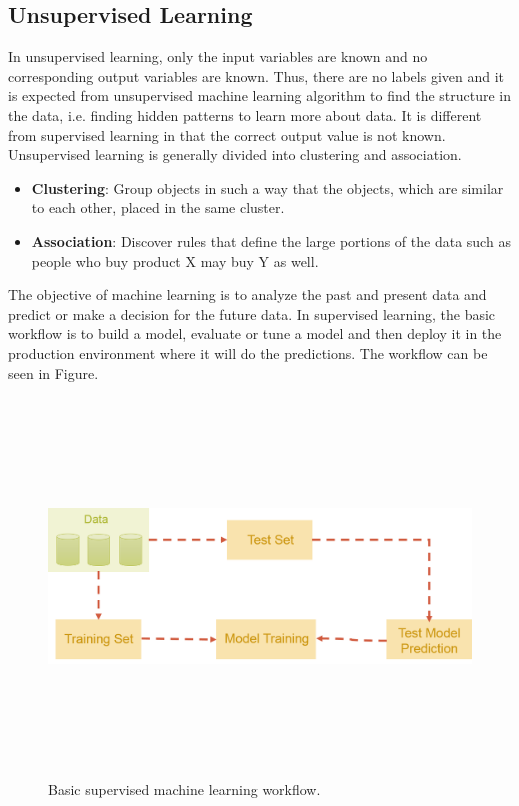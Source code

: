 \subsection{Unsupervised Learning}

In unsupervised learning, only the input variables are known and no corresponding output variables are known. Thus, there are no labels given and it is expected from unsupervised machine learning algorithm to find the structure in the data, i.e. finding hidden patterns to learn more about data. It is different from supervised learning in that the correct output value is not known. Unsupervised learning is generally divided into clustering and association.

\begin{itemize}
	\item \textbf{Clustering}: Group objects in such a way that the objects, which are similar to each other, placed in the same cluster.
	\item \textbf{Association}: Discover rules that define the large portions of the data such as people who buy product X may buy Y as well.
\end{itemize}

The objective of machine learning is to analyze the past and present data and predict or make a decision for the future data. In supervised learning, the basic workflow is to build a model, evaluate or tune a model and then deploy it in the production environment where it will do the predictions. The workflow can be seen in Figure.


\begin{figure}[htpb]
	\centering
	\includegraphics[width=12cm,height=10cm,keepaspectratio=true]{images/basic-ml-model.png}
	\caption{
		Basic supervised machine learning workflow.
	}
	\label{fig:basic-ml-model}
\end{figure}


